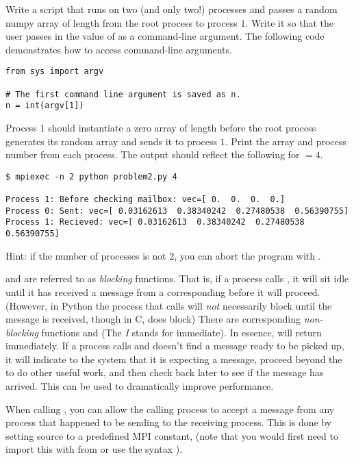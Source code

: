 \begin{problem}
Write a script that runs on two (and only two!) processes and passes a random numpy array of length  from the root process to process $1$.
Write it so that the user passes in the value of  as a command-line argument. 
The following code demonstrates how to access command-line arguments.
\begin{lstlisting}
from sys import argv
    
# The first command line argument is saved as n.
n = int(argv[1])
\end{lstlisting}
Process $1$ should instantiate a zero array of length  before the root process generates its random array and sends it to process $1$.
Print the array and process number from each process.
The output should reflect the following for  $ = 4$.
\begin{lstlisting}[style=ShellOutput]
$ mpiexec -n 2 python problem2.py 4

Process 1: Before checking mailbox: vec=[ 0.  0.  0.  0.]
Process 0: Sent: vec=[ 0.03162613  0.38340242  0.27480538  0.56390755]
Process 1: Recieved: vec=[ 0.03162613  0.38340242  0.27480538  0.56390755]
\end{lstlisting}

\noindent Hint: if the number of processes is not $2$, you can abort the program with .
\end{problem}


\begin{info}
 and  are referred to as \emph{blocking} functions.
That is, if a process calls , it will sit idle until it has received a message from a corresponding  before it will proceed.
(However, in Python the process that calls  will \emph{not} necessarily block until the message is received, though in C,  does block)
There are corresponding \emph{non-blocking} functions  and  (The \emph{I} stands for immediate).
In essence,  will return immediately.
If a process calls  and doesn't find a message ready to be picked up, it will indicate to the system that it is expecting a message, proceed beyond the  to do other useful work, and then check back later to see if the message has arrived.
This can be used to dramatically improve performance.
\end{info}

\begin{info}
    When calling , you can allow the calling process to accept a message from any process that happened to be sending to the receiving process.
    This is done by setting source to a predefined MPI constant,  (note that you would first need to import this with from  or use the syntax ).
\end{info}

